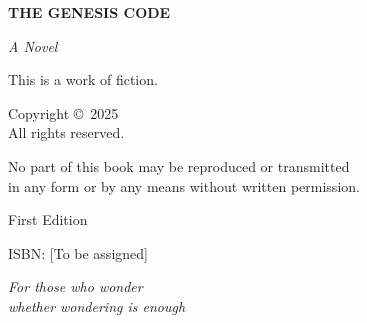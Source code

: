 \documentclass[12pt,twoside,openright]{book}
\begin{document}

\frontmatter

\thispagestyle{empty}
\begin{center}
    \vspace*{3cm}

    {\Huge\sffamily\bfseries THE GENESIS CODE}

    \vspace{2cm}

    {\Large\itshape A Novel}

    \vfill

    {\large{}}

\end{center}

\cleardoublepage

\thispagestyle{empty}
\vspace*{\fill}
\begin{center}
{\small
This is a work of fiction.\\[0.5em]

\vspace{1cm}

Copyright \copyright\ 2025\\[0.5em]
All rights reserved.\\[0.5em]

\vspace{1cm}

No part of this book may be reproduced or transmitted\\
in any form or by any means without written permission.\\[0.5em]

\vspace{1cm}

First Edition\\[0.5em]

\vspace{1cm}

ISBN: [To be assigned]
}
\end{center}
\vspace*{\fill}

\cleardoublepage

\thispagestyle{empty}
\vspace*{5cm}
\begin{center}
\itshape
For those who wonder\\
whether wondering is enough
\end{center}
\end{document}
